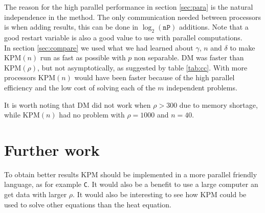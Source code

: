 
The reason for the high parallel performance in section \ref{sec:para} is the natural independence in the method. The only communication needed between processors is when adding results, this can be done in $\log_2(\texttt{nP})$ additions. Note that a good restart variable is also a good value to use with parallel computations. \\

In section \ref{sec:compare} we used what we had learned about $\gamma$, $n$ and $\delta$ to make KPM$(n)$ run as fast as possible with $p$ non separable. DM was faster than KPM$(\rho)$, but not asymptotically, as suggested by table \ref{tab:cc}. With more processors KPM$(n)$ would have been faster because of the high parallel efficiency and the low cost of solving each of the $m$ independent problems.

It is worth noting that DM did not work when $\rho>300$ due to memory shortage, while KPM$(n)$ had no problem with $\rho = 1000$ and $n = 40$. \\




\chapter*{Further work}%
To obtain better results KPM should be implemented in a more parallel friendly language, as for example \texttt{C}. It would also be a benefit to use a large computer an get data with larger $\rho$.
It would also be interesting to see how KPM could be used to solve other equations than the heat equation.
